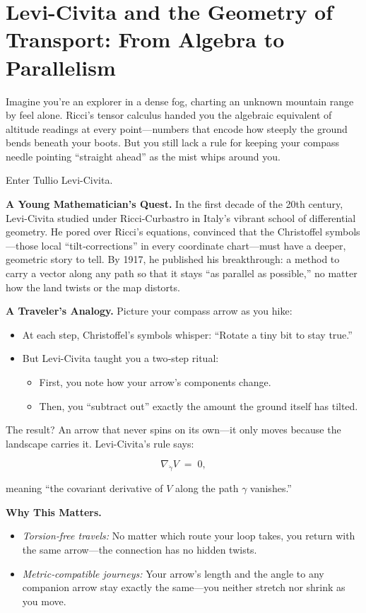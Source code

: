 \section{Levi-Civita and the Geometry of Transport: From Algebra to Parallelism}

Imagine you’re an explorer in a dense fog, charting an unknown mountain range by feel alone.  Ricci’s tensor calculus handed you the algebraic equivalent of altitude readings at every point—numbers that encode how steeply the ground bends beneath your boots.  But you still lack a rule for keeping your compass needle pointing “straight ahead” as the mist whips around you.

Enter Tullio Levi-Civita.

\bigskip
\noindent\textbf{A Young Mathematician’s Quest.}  
In the first decade of the 20th century, Levi-Civita studied under Ricci-Curbastro in Italy’s vibrant school of differential geometry.  He pored over Ricci’s equations, convinced that the Christoffel symbols—those local “tilt‐corrections” in every coordinate chart—must have a deeper, geometric story to tell.  By 1917, he published his breakthrough: a method to carry a vector along any path so that it stays “as parallel as possible,” no matter how the land twists or the map distorts.

\bigskip
\noindent\textbf{A Traveler’s Analogy.}  
Picture your compass arrow as you hike:

\begin{itemize}
    \item At each step, Christoffel’s symbols whisper: “Rotate a tiny bit to stay true.”  
    \item But Levi-Civita taught you a two‐step ritual:  
    \begin{itemize}
        \item First, you note how your arrow’s components change.  
        \item Then, you “subtract out” exactly the amount the ground itself has tilted.  
    \end{itemize}
\end{itemize}

The result?  An arrow that never spins on its own—it only moves because the landscape carries it.  Levi-Civita’s rule says:

\[
\boxed{\;
\nabla_{\dot\gamma} V \;=\; 0,
\;}
\]

meaning “the covariant derivative of \(V\) along the path \(\gamma\) vanishes.”

\bigskip
\noindent\textbf{Why This Matters.}  
\begin{itemize}
  \item \emph{Torsion‐free travels:}  No matter which route your loop takes, you return with the same arrow—the connection has no hidden twists.  
  \item \emph{Metric‐compatible journeys:}  Your arrow’s length and the angle to any companion arrow stay exactly the same—you neither stretch nor shrink as you move.  
\end{itemize}

